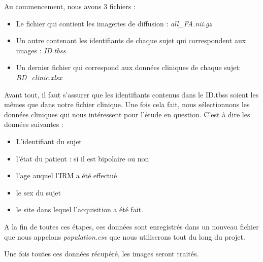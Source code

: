 Au commencement, nous avons 3 fichiers :
\begin{itemize}
	\item Le fichier qui contient les imageries de diffusion : \textit{all\_FA.nii.gz}
	\item Un autre contenant les identifiants de chaque sujet qui correspondent aux images : \textit{ID.tbss}
	\item Un dernier fichier qui correspond aux données cliniques de chaque sujet: \textit{BD\_clinic.xlsx} 
\end{itemize}

Avant tout, il faut s'assurer que les identifiants contenus dans le ID.tbss soient les mêmes que dans notre fichier clinique.
Une fois cela fait, nous sélectionnons les données cliniques qui nous intéressent pour l'étude en question. C'est à dire les données suivantes : 
\begin{itemize}
	\item L'identifiant du sujet
	\item l'état du patient : si il est bipolaire ou non
	\item l'age auquel l'IRM a été effectué
	\item le sex du sujet
	\item le site dans lequel l'acquisition a été fait. 
\end{itemize}

A la fin de toutes ces étapes, ces données sont enregistrés dans un nouveau fichier que nous appelons \textit{population.csv} que nous utiliserons tout du long du projet.


Une fois toutes ces données récupéré, les images seront traités. 